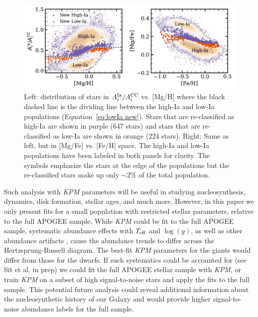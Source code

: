 \documentclass[modern, linenumbers]{aastex631}
\newcommand{\logg}{\log(g)}
\newcommand{\teff}{T_{\rm eff}}
\newcommand{\Acc}{A^{\rm CC}_{i}}
\newcommand{\AIa}{A^{\rm Ia}_{i}}
\newcommand{\name}{\textsl{KPM}}
\begin{document}
\begin{figure}[htb!]
    \centering
    \includegraphics[width=.9\textwidth]{Paper/Figures/pop_divis.pdf}
    \caption{Left: distribution of stars in $\AIa/\Acc$ vs. [Mg/H] where the black dashed line is the dividing line between the high-Ia and low-Ia populations (Equation~\ref{eq:lowIa new}). Stars that are re-classified as high-Ia are shown in purple (647 stars) and stars that are re-classified as low-Ia are shown in orange (224 stars). Right: Same as left, but in [Mg/Fe] vs. [Fe/H] space. The high-Ia and low-Ia populations have been labeled in both panels for clarity. The symbols emphasize the stars at the edge of the populations but the re-classified stars make up only $\sim 2\%$ of the total population.}
    \label{fig:pop_divis}
\end{figure}

Such analysis with \name{} parameters will be useful in studying nucleosynthesis, dynamics, disk formation, stellar ages, and much more. However, in this paper we only present fits for a small population with restricted stellar parameters, relative to the full APOGEE sample. 
While \name{} could be fit to the full APOGEE sample, systematic abundance effects with $\teff$ and $\logg$, as well as other abundance artifacts \citep[e.g.,][]{jonsson2020, griffith2021a}, cause the abundance trends to differ across the Hertzsprung-Russell diagram. The best-fit \name{} parameters for the giants would differ from those for the dwarfs. If such systematics could be accounted for (see Sit et al. in prep) we could fit the full APOGEE stellar sample with \name{}, or train \name{} on a subset of high signal-to-noise stars and apply the fits to the full sample. This potential future analysis could reveal additional information about the nucleosynthetic history of our Galaxy and would provide higher signal-to-noise abundance labels for the full sample.
\end{document}
